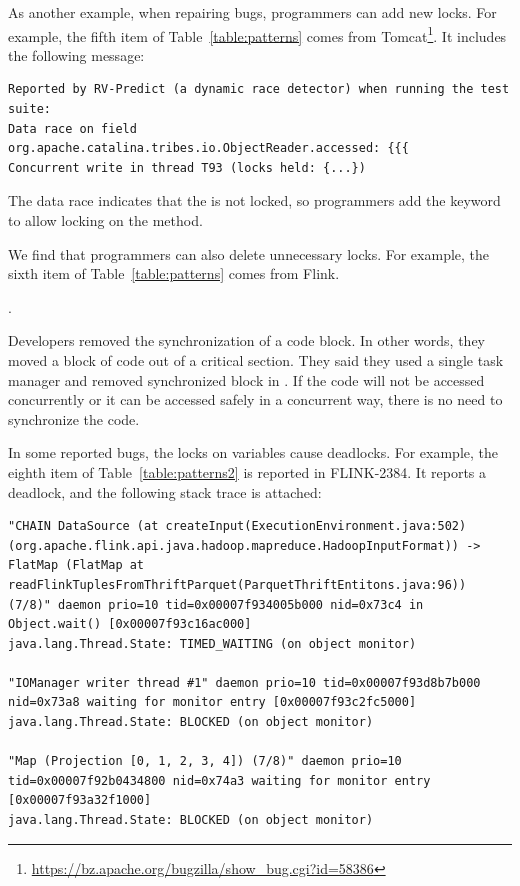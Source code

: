 As another example, when repairing bugs, programmers can add new locks. For example, the fifth item of Table~\ref{table:patterns} comes from Tomcat\footnote{\url{https://bz.apache.org/bugzilla/show\_bug.cgi?id=58386}}. It includes the following message:

\begin{lstlisting}
Reported by RV-Predict (a dynamic race detector) when running the test suite:
Data race on field org.apache.catalina.tribes.io.ObjectReader.accessed: {{{
Concurrent write in thread T93 (locks held: {...})
\end{lstlisting}

The data race indicates that the  is not locked, so programmers add the  keyword to allow locking on the method.

We find that programmers can also delete unnecessary locks. For example, the sixth item of Table~\ref{table:patterns} comes from Flink.

.

Developers removed the synchronization of a code block. In other words, they moved a block of code out of a critical section. They said they used a single task manager and removed synchronized block in . If the code will not be accessed concurrently or it can be accessed safely in a concurrent way, there is no need to synchronize the code.

In some reported bugs, the locks on variables cause deadlocks. For example, the eighth item of Table~\ref{table:patterns2} is reported in FLINK-2384. It reports a deadlock, and the following stack trace is attached:

\begin{lstlisting}
"CHAIN DataSource (at createInput(ExecutionEnvironment.java:502) (org.apache.flink.api.java.hadoop.mapreduce.HadoopInputFormat)) -> FlatMap (FlatMap at readFlinkTuplesFromThriftParquet(ParquetThriftEntitons.java:96)) (7/8)" daemon prio=10 tid=0x00007f934005b000 nid=0x73c4 in Object.wait() [0x00007f93c16ac000]
java.lang.Thread.State: TIMED_WAITING (on object monitor)

"IOManager writer thread #1" daemon prio=10 tid=0x00007f93d8b7b000 nid=0x73a8 waiting for monitor entry [0x00007f93c2fc5000]
java.lang.Thread.State: BLOCKED (on object monitor)

"Map (Projection [0, 1, 2, 3, 4]) (7/8)" daemon prio=10 tid=0x00007f92b0434800 nid=0x74a3 waiting for monitor entry [0x00007f93a32f1000]
java.lang.Thread.State: BLOCKED (on object monitor)
\end{lstlisting}

